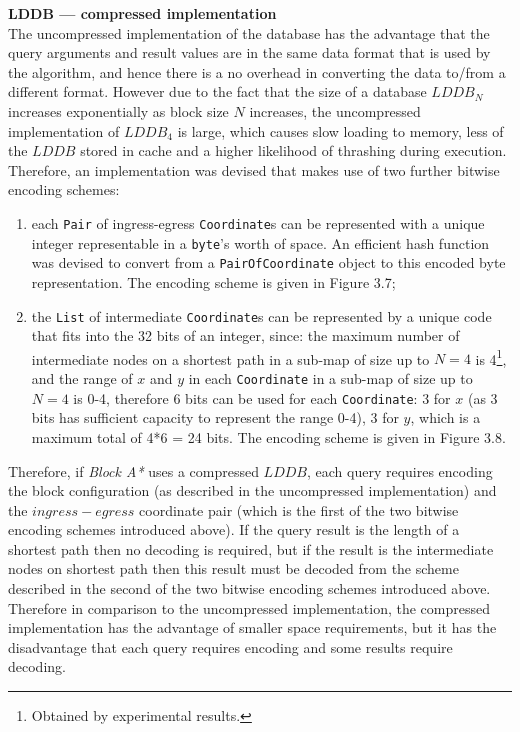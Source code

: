 \documentclass[12pt,notitlepage]{report}
\begin{document}
\noindent
{\bfseries LDDB --- compressed implementation}\\
\noindent
The uncompressed implementation of the database has the advantage that the query arguments and result values are in the same data format that is used by the algorithm, and hence there is a no overhead in converting the data to/from a different format. However due to the fact that the size of a database $LDDB_{N}$ increases exponentially as block size $N$ increases, the uncompressed implementation of $LDDB_{4}$ is large, which causes slow loading to memory, less of the $LDDB$ stored in cache and a higher likelihood of thrashing during execution. Therefore, an implementation was devised that makes use of two further bitwise encoding schemes:
\begin{enumerate}
\item each {\tt Pair} of ingress-egress {\tt Coordinate}s can be represented with a unique integer representable in a {\tt byte}'s worth of space. An efficient hash function was devised to convert from a {\tt PairOfCoordinate} object to this encoded byte representation. The encoding scheme is given in Figure 3.7;
\item the {\tt List} of intermediate {\tt Coordinate}s can be represented by a unique code that fits into the 32 bits of an integer, since: the maximum number of intermediate nodes on a shortest path in a sub-map of size up to {$N=4$} is 4\footnote{Obtained by experimental results.}, and the range of $x$ and $y$ in each {\tt Coordinate} in a sub-map of size up to {$N=4$} is 0-4, therefore 6 bits can be used for each {\tt Coordinate}: 3 for $x$ (as 3 bits has sufficient capacity to represent the range 0-4), 3 for $y$, which is a maximum total of 4*6 = 24 bits. The encoding scheme is given in Figure 3.8.
\end{enumerate}

\noindent 
Therefore, if {\em Block A*} uses a compressed $LDDB$, each query requires encoding the block configuration (as described in the uncompressed implementation) and the $ingress-egress$ coordinate pair (which is the first of the two bitwise encoding schemes introduced above). If the query result is the length of a shortest path then no decoding is required, but if the result is the intermediate nodes on shortest path then this result must be decoded from the scheme described in the second of the two bitwise encoding schemes introduced above. Therefore in comparison to the uncompressed implementation, the compressed implementation has the advantage of smaller space requirements, but it has the disadvantage that each query requires encoding and some results require decoding.
\end{document}
